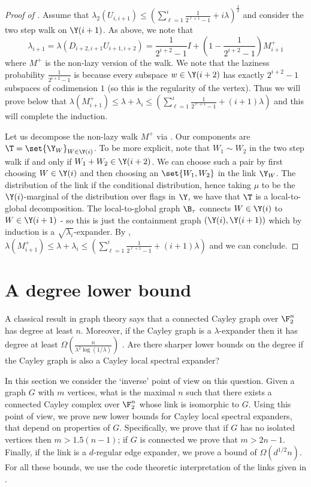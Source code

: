 \begin{proof}[Proof of ]
    Assume that \(\lambda_2(U_{i,i+1}) \leq \left (\sum_{\ell=1}^i \frac{1}{2^{\ell+1}-1} + i \lambda \right )^{\frac{1}{2}}\) and consider the two step walk on \(\Y(i+1)\). As above, we note that
    \[\lambda_{i+1} = \lambda(D_{i+2,i+1}U_{i+1,i+2}) = \frac{1}{2^{i+2}-1} I + \left (1- \frac{1}{2^{i+2}-1} \right ) M_{i+1}^+\]
    where \(M^+\) is the non-lazy version of the walk. We note that the laziness probability \(\frac{1}{2^{i+2}-1}\) is because every subspace \(w \in \Y(i+2)\) has exactly \(2^{i+2}-1\) subspaces of codimension \(1\) (so this is the regularity of the vertex). Thus we will prove below that \(\lambda (M_{i+1}^+) \leq \lambda + \lambda_i \leq \left (\sum_{\ell=1}^i \frac{1}{2^{\ell+1}-1} + (i+1) \lambda \right )\) and this will complete the induction.
    
    Let us decompose the non-lazy walk \(M^+\) via . Our components are \(\T = \set{\Y_W}_{W \in \Y(i)}\). To be more explicit, note that \(W_1 \sim W_2\) in the two step walk if and only if \(W_1+W_2 \in \Y(i+2)\). We can choose such a pair by first choosing \(W \in \Y(i)\) and then choosing an \(\set{W_1,W_2}\) in the link \(\Y_{W}\). The distribution of the link if the conditional distribution, hence taking \(\mu\) to be the \(\Y(i)\)-marginal of the distribution over flags in \(\Y\), we have that \(\T\) is a local-to-global decomposition. The local-to-global graph \(\B_\tau\) connects \(W \in \Y(i)\) to \(W \in \Y(i+1)\) - so this is just the containment graph \((\Y(i),\Y(i+1))\) which by induction is a \(\sqrt{\lambda_i}\)-expander. By ,
    \(\lambda (M_{i+1}^+) \leq \lambda + \lambda_i \leq \left (\sum_{\ell=1}^i \frac{1}{2^{\ell+1}-1} + (i+1) \lambda \right )\) and we can conclude.
\end{proof}

\section{A degree lower bound} \label{app:degree-lower-bound}
    A classical result in graph theory says that a connected Cayley graph over \(\F_2^n\) has degree at least \(n\). Moreover, if the Cayley graph is a \(\lambda\)-expander then it has degree at least \(\Omega(\frac{n}{\lambda^2 \log(1/\lambda)})\) \cite{alon1992simple}. Are there sharper lower bounds on the degree if the Cayley graph is also a Cayley local spectral expander?
    
    In this section we consider the `inverse' point of view on this question. Given a graph \(G\) with \(m\) vertices, what is the maximal \(n\) such that there exists a connected Cayley complex over $\F_2^n$ whose link is isomorphic to \(G\). Using this point of view, we prove new lower bounds for Cayley local spectral expanders, that depend on properties of \(G\). Specifically, we prove that if \(G\) has no isolated vertices then \(m > 1.5 (n-1)\); if \(G\) is connected we prove that \(m > 2n-1\). Finally, if the link is a \(d\)-regular edge expander, we prove a bound of \(\Omega(d^{1/2} n)\). For all these bounds, we use the code theoretic interpretation of the links given in \cite{Golowich2023}.
    
